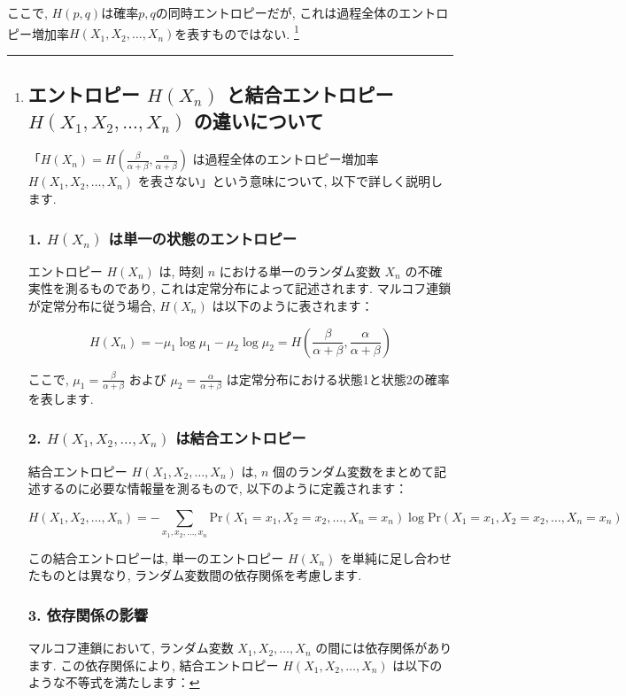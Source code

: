 \documentclass[a4j]{jsarticle}
\begin{document}
ここで, $H(p, q)$は確率$p, q$の同時エントロピーだが, これは過程全体のエントロピー増加率$H(X_1, X_2, \ldots, X_n)$を表すものではない.
\footnote{
	\subsection*{エントロピー $H(X_n)$ と結合エントロピー $H(X_1, X_2, \ldots, X_n)$ の違いについて}

	「$H(X_n) = H\left(\frac{\beta}{\alpha + \beta}, \frac{\alpha}{\alpha + \beta}\right)$ は過程全体のエントロピー増加率 $H(X_1, X_2, \ldots, X_n)$ を表さない」という意味について, 以下で詳しく説明します.

	\subsubsection*{1. $H(X_n)$ は単一の状態のエントロピー}
	エントロピー $H(X_n)$ は, 時刻 $n$ における単一のランダム変数 $X_n$ の不確実性を測るものであり, これは定常分布によって記述されます. マルコフ連鎖が定常分布に従う場合, $H(X_n)$ は以下のように表されます：

	\[
		H(X_n) = -\mu_1 \log \mu_1 - \mu_2 \log \mu_2 = H\left(\frac{\beta}{\alpha + \beta}, \frac{\alpha}{\alpha + \beta}\right)
	\]

	ここで, $\mu_1 = \frac{\beta}{\alpha + \beta}$ および $\mu_2 = \frac{\alpha}{\alpha + \beta}$ は定常分布における状態1と状態2の確率を表します.

	\subsubsection*{2. $H(X_1, X_2, \ldots, X_n)$ は結合エントロピー}
	結合エントロピー $H(X_1, X_2, \ldots, X_n)$ は, $n$ 個のランダム変数をまとめて記述するのに必要な情報量を測るもので, 以下のように定義されます：

	\[
		H(X_1, X_2, \ldots, X_n) = - \sum_{x_1, x_2, \ldots, x_n} \text{Pr}(X_1 = x_1, X_2 = x_2, \ldots, X_n = x_n) \log \text{Pr}(X_1 = x_1, X_2 = x_2, \ldots, X_n = x_n)
	\]

	この結合エントロピーは, 単一のエントロピー $H(X_n)$ を単純に足し合わせたものとは異なり, ランダム変数間の依存関係を考慮します.

	\subsubsection*{3. 依存関係の影響}
	マルコフ連鎖において, ランダム変数 $X_1, X_2, \ldots, X_n$ の間には依存関係があります. この依存関係により, 結合エントロピー $H(X_1, X_2, \ldots, X_n)$ は以下のような不等式を満たします：

}
\end{document}
